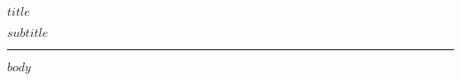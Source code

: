 \documentclass[11pt]{article}
\begin{document}
\vspace*{0.4cm}
\begin{center}
  {\LARGE $title$ \par}
  \vspace{0.25cm}
  {\large\textcolor{muted}{$subtitle$}}
\end{center}
\vspace{0.2cm}
\hrule
\vspace{1.1em}
$body$
\end{document}
